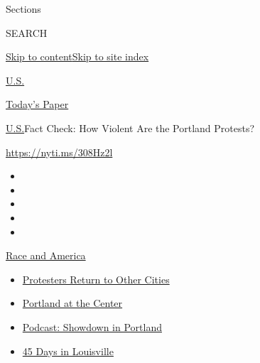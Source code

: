 Sections

SEARCH

\protect\hyperlink{site-content}{Skip to
content}\protect\hyperlink{site-index}{Skip to site index}

\href{https://www.nytimes3xbfgragh.onion/section/us}{U.S.}

\href{https://myaccount.nytimes3xbfgragh.onion/auth/login?response_type=cookie\&client_id=vi}{}

\href{https://www.nytimes3xbfgragh.onion/section/todayspaper}{Today's
Paper}

\href{/section/us}{U.S.}\textbar{}Fact Check: How Violent Are the
Portland Protests?

\href{https://nyti.ms/308Hz2l}{https://nyti.ms/308Hz2l}

\begin{itemize}
\item
\item
\item
\item
\item
\end{itemize}

\href{https://www.nytimes3xbfgragh.onion/news-event/george-floyd-protests-minneapolis-new-york-los-angeles?action=click\&pgtype=Article\&state=default\&region=TOP_BANNER\&context=storylines_menu}{Race
and America}

\begin{itemize}
\tightlist
\item
  \href{https://www.nytimes3xbfgragh.onion/2020/07/26/us/protests-portland-seattle-trump.html?action=click\&pgtype=Article\&state=default\&region=TOP_BANNER\&context=storylines_menu}{Protesters
  Return to Other Cities}
\item
  \href{https://www.nytimes3xbfgragh.onion/2020/07/24/us/portland-oregon-protests-white-race.html?action=click\&pgtype=Article\&state=default\&region=TOP_BANNER\&context=storylines_menu}{Portland
  at the Center}
\item
  \href{https://www.nytimes3xbfgragh.onion/2020/07/23/podcasts/the-daily/portland-protests.html?action=click\&pgtype=Article\&state=default\&region=TOP_BANNER\&context=storylines_menu}{Podcast:
  Showdown in Portland}
\item
  \href{https://www.nytimes3xbfgragh.onion/interactive/2020/07/16/us/black-lives-matter-protests-louisville-breonna-taylor.html?action=click\&pgtype=Article\&state=default\&region=TOP_BANNER\&context=storylines_menu}{45
  Days in Louisville}
\end{itemize}

